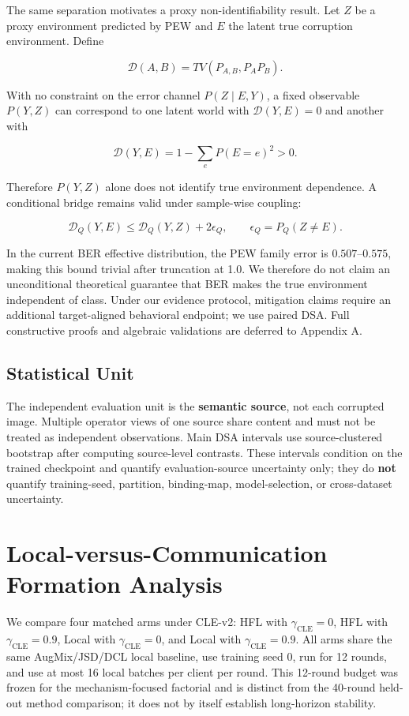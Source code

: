 \documentclass[10pt,twocolumn]{article}
\begin{document}
The same separation motivates a proxy non-identifiability result. Let \(Z\) be a proxy environment predicted by PEW and \(E\) the latent true corruption environment. Define

\[
\mathcal D(A,B)=TV(P_{A,B},P_AP_B).
\]

With no constraint on the error channel \(P(Z\mid E,Y)\), a fixed observable \(P(Y,Z)\) can correspond to one latent world with \(\mathcal D(Y,E)=0\) and another with

\[
\mathcal D(Y,E)=1-\sum_eP(E=e)^2>0.
\]

Therefore \(P(Y,Z)\) alone does not identify true environment dependence. A conditional bridge remains valid under sample-wise coupling:

\[
\mathcal D_Q(Y,E)\le
\mathcal D_Q(Y,Z)+2\epsilon_Q,
\qquad
\epsilon_Q=P_Q(Z\neq E).
\]

In the current BER effective distribution, the PEW family error is \(0.507\)--\(0.575\), making this bound trivial after truncation at 1.0. We therefore do not claim an unconditional theoretical guarantee that BER makes the true environment independent of class. Under our evidence protocol, mitigation claims require an additional target-aligned behavioral endpoint; we use paired DSA. Full constructive proofs and algebraic validations are deferred to Appendix A.

\subsection{Statistical Unit}

The independent evaluation unit is the \textbf{semantic source}, not each corrupted image. Multiple operator views of one source share content and must not be treated as independent observations. Main DSA intervals use source-clustered bootstrap after computing source-level contrasts. These intervals condition on the trained checkpoint and quantify evaluation-source uncertainty only; they do \textbf{not} quantify training-seed, partition, binding-map, model-selection, or cross-dataset uncertainty.

\section{Local-versus-Communication Formation Analysis}

We compare four matched arms under CLE-v2: HFL with \(\gamma_{\mathrm{CLE}}=0\), HFL with \(\gamma_{\mathrm{CLE}}=0.9\), Local with \(\gamma_{\mathrm{CLE}}=0\), and Local with \(\gamma_{\mathrm{CLE}}=0.9\). All arms share the same AugMix/JSD/DCL local baseline, use training seed 0, run for 12 rounds, and use at most 16 local batches per client per round. This 12-round budget was frozen for the mechanism-focused factorial and is distinct from the 40-round held-out method comparison; it does not by itself establish long-horizon stability.
\end{document}
